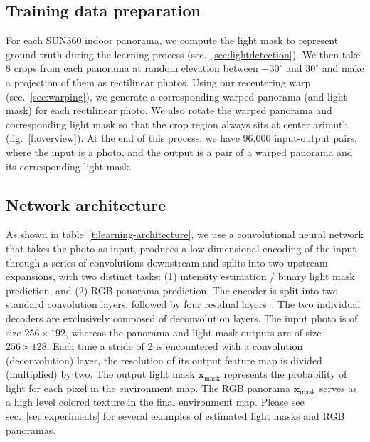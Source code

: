\subsection{Training data preparation}
\label{sec:ldr-data-prep}

For each SUN360 indoor panorama, we compute the light mask to represent ground truth during the learning process (sec.~\ref{sec:lightdetection}). We then take 8 crops from each panorama at random elevation between $-30^\circ$ and $30^\circ$ and make a projection of them as rectilinear photos. Using our recentering warp (sec.~\ref{sec:warping}), we generate a corresponding warped panorama (and light mask) for each rectilinear photo. We also rotate the warped panorama and corresponding light mask so that the crop region always sits at center azimuth (fig.~\ref{f:overview}).  At the end of this process, we have 96,000 input-output pairs, where the input is a photo, and the output is a pair of a warped panorama and its corresponding light mask.

\subsection{Network architecture} 

As shown in table~\ref{t:learning-architecture}, we use a convolutional neural network that takes the photo as input, produces a low-dimensional encoding of the input through a series of convolutions downstream and splits into two upstream expansions, with two distinct tasks: (1) intensity estimation / binary light mask prediction, and (2) RGB panorama prediction. The encoder is split into two standard convolution layers, followed by four residual layers~\cite{he-cvpr-16}. The two individual decoders are exclusively composed of deconvolution layers. The input photo is of size $256\times192$, whereas the panorama and light mask outputs are of size $256\times128$. Each time a stride of 2 is encountered with a convolution (deconvolution) layer, the resolution of its output feature map is divided (multiplied) by two. The output light mask $\mathbf{x}_\text{mask}$ represents the probability of light for each pixel in the environment map. The RGB panorama $\mathbf{x}_\text{mask}$ serves as a high level colored texture in the final environment map. Please see sec.~\ref{sec:experiments} for several examples of estimated light masks and RGB panoramas.


